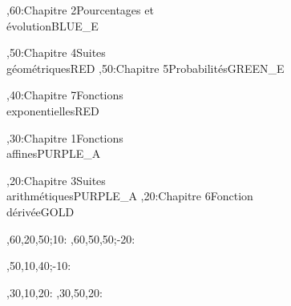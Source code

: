 \documentclass[tikz]{standalone}
\begin{document}
%
	\begin{chart}
	
	
	,60:{Chapitre 2}{Pourcentages et \\ évolution}{}{BLUE_E}
	
	
	,50:{Chapitre 4}{Suites \\ géométriques}{}{RED}
	,50:{Chapitre 5}{Probabilités}{}{GREEN_E}
	
	,40:{Chapitre 7}{Fonctions \\ exponentielles}{}{RED}	
	
	,30:{Chapitre 1}{Fonctions \\ affines}{}{PURPLE_A}
	
	,20:{Chapitre 3}{Suites \\ arithmétiques}{}{PURPLE_A}
	,20:{Chapitre 6}{Fonction \\ dérivée}{}{GOLD}
	
	
	
	
	
	
	
	

	
	,60,20,50;10:
	,60,50,50;-20:
	
	,50,10,40;-10:
	
	
	,30,10,20:
	,30,50,20:
	
	
	\end{chart}
%
\end{document}
